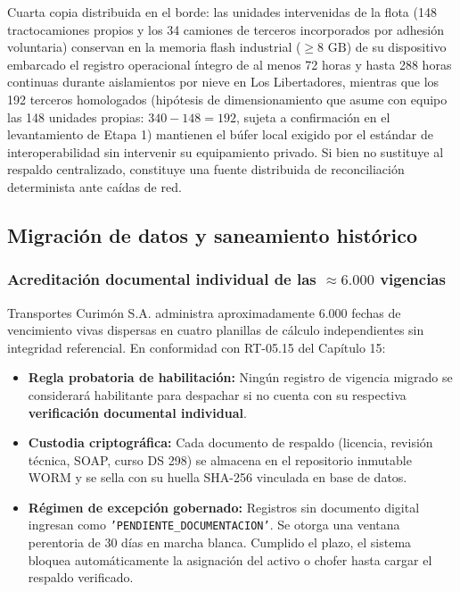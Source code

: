 \begin{alertInfo}
Cuarta copia distribuida en el borde: las unidades intervenidas de la flota (148 tractocamiones propios y los 34 camiones de terceros incorporados por adhesión voluntaria) conservan en la memoria flash industrial ($\ge 8\text{ GB}$) de su dispositivo embarcado el registro operacional íntegro de al menos 72 horas y hasta 288 horas continuas durante aislamientos por nieve en Los Libertadores, mientras que los 192 terceros homologados (hipótesis de dimensionamiento que asume con equipo las 148 unidades propias: $340 - 148 = 192$, sujeta a confirmación en el levantamiento de Etapa 1) mantienen el búfer local exigido por el estándar de interoperabilidad sin intervenir su equipamiento privado. Si bien no sustituye al respaldo centralizado, constituye una fuente distribuida de reconciliación determinista ante caídas de red.
\end{alertInfo}

\subsection{Migración de datos y saneamiento histórico}

\subsubsection{Acreditación documental individual de las $\approx 6.000$ vigencias}

Transportes Curimón S.A. administra aproximadamente 6.000 fechas de vencimiento vivas dispersas en cuatro planillas de cálculo independientes sin integridad referencial. En conformidad con RT-05.15 del Capítulo 15:

\begin{itemize}
    \item \textbf{Regla probatoria de habilitación:} Ningún registro de vigencia migrado se considerará habilitante para despachar si no cuenta con su respectiva \textbf{verificación documental individual}.
    \item \textbf{Custodia criptográfica:} Cada documento de respaldo (licencia, revisión técnica, SOAP, curso DS 298) se almacena en el repositorio inmutable WORM y se sella con su huella SHA-256 vinculada en base de datos.
    \item \textbf{Régimen de excepción gobernado:} Registros sin documento digital ingresan como \texttt{'PENDIENTE\_DOCUMENTACION'}. Se otorga una ventana perentoria de 30 días en marcha blanca. Cumplido el plazo, el sistema bloquea automáticamente la asignación del activo o chofer hasta cargar el respaldo verificado.
\end{itemize}

